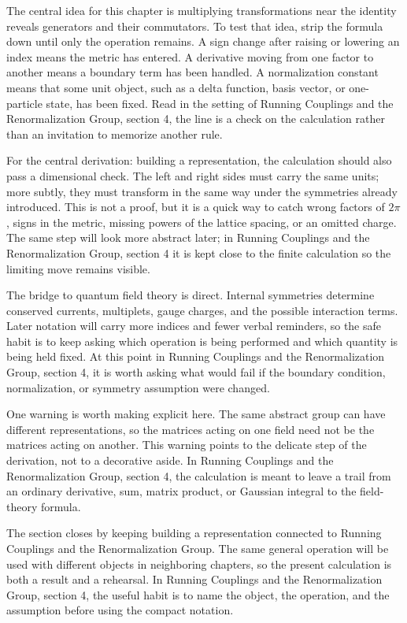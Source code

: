The central idea for this chapter is multiplying transformations near the identity reveals generators and their commutators.  To test that idea, strip the formula down until only the operation remains.  A sign change after raising or lowering an index means the metric has entered.  A derivative moving from one factor to another means a boundary term has been handled.  A normalization constant means that some unit object, such as a delta function, basis vector, or one-particle state, has been fixed.  Read in the setting of Running Couplings and the Renormalization Group, section 4, the line is a check on the calculation rather than an invitation to memorize another rule.

For the central derivation: building a representation, the calculation should also pass a dimensional check.  The left and right sides must carry the same units; more subtly, they must transform in the same way under the symmetries already introduced.  This is not a proof, but it is a quick way to catch wrong factors of \(2\pi\), signs in the metric, missing powers of the lattice spacing, or an omitted charge.  The same step will look more abstract later; in Running Couplings and the Renormalization Group, section 4 it is kept close to the finite calculation so the limiting move remains visible.

The bridge to quantum field theory is direct.  Internal symmetries determine conserved currents, multiplets, gauge charges, and the possible interaction terms.  Later notation will carry more indices and fewer verbal reminders, so the safe habit is to keep asking which operation is being performed and which quantity is being held fixed.  At this point in Running Couplings and the Renormalization Group, section 4, it is worth asking what would fail if the boundary condition, normalization, or symmetry assumption were changed.

One warning is worth making explicit here.  The same abstract group can have different representations, so the matrices acting on one field need not be the matrices acting on another.  This warning points to the delicate step of the derivation, not to a decorative aside.  In Running Couplings and the Renormalization Group, section 4, the calculation is meant to leave a trail from an ordinary derivative, sum, matrix product, or Gaussian integral to the field-theory formula.

The section closes by keeping building a representation connected to Running Couplings and the Renormalization Group.  The same general operation will be used with different objects in neighboring chapters, so the present calculation is both a result and a rehearsal.  In Running Couplings and the Renormalization Group, section 4, the useful habit is to name the object, the operation, and the assumption before using the compact notation.



